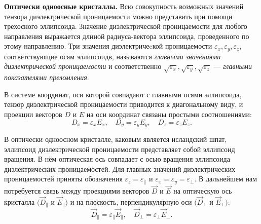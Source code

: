 \documentclass[10pt, a4paper]{article}
\begin{document}
\noindent \textbf{Оптически одноосные кристаллы.} Всю совокупность возможных значений тензора диэлектрической проницаемости можно представить при помощи трехосного эллипсоида. Значение диэлектрической проницаемости для любого направления выражается длиной радиуса-вектора эллипсоида, проведенного по этому направлению. Три значения диэлектричеcкой проницаемости $\varepsilon_x, \varepsilon_y, \varepsilon_z$, соответствующие осям эллипсоидв, называются \textit{главными значениями диэлектрической проницаемости} и соответственно $\sqrt{\varepsilon_x}, \sqrt{\varepsilon_y}, \sqrt{\varepsilon_z}$ --- \textit{главными показателями преломления}.

В системе координат, оси которой совпадают с главными осями эллипсоида, тензор диэлектрической проницаемости приводится к диагональному виду, и проекции векторов $D$ и $E$ на оси координат связаны простыми соотношениями:
\begin{equation*}
	D_x = \varepsilon_x E_x, \quad D_y = \varepsilon_y E_y, \quad D_z = \varepsilon_z E_z.
\end{equation*}

В оптически одноосном кристалле, каковым является исландский шпат, эллипсоид диэлектрической проницаемости представляет собой эллипсоид вращения.
В нём оптическая ось совпадает с осью вращения эллипсоида диэлектрических проницаемостей. Для главных значений диэлектрических проницаемостей приняты обозначения $\varepsilon_z = \varepsilon_\parallel$ и $\varepsilon_x = \varepsilon_y = \varepsilon_\perp$. В дальнейшем нам потребуется связь между проекциями векторов $\vec D$ и $\vec E$ на оптическую ось кристалла $(\vec D_\parallel $ и $\vec E_\parallel )$ и на плоскость, перпендикулярную оси $(\vec D_\perp $ и $\vec E_\perp )$:
\begin{equation}
	\vec D_\parallel  = \varepsilon_\parallel \vec E_\parallel , \quad \vec D_\perp  = \varepsilon_\perp \vec E_\perp. 
\end{equation}
\end{document}
